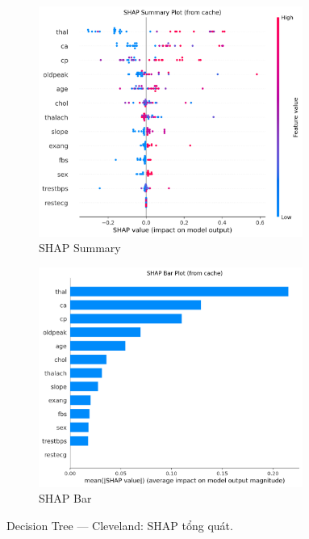 \begin{figure}[H]
\centering
\begin{subfigure}[b]{0.48\textwidth}\centering
\includegraphics[width=0.95\textwidth]{Result/cleveland_dataset/DT/SHAP/Summary.png}
\caption{SHAP Summary}\label{fig:dt_clev_shap_summary}
\end{subfigure}\hfill
\begin{subfigure}[b]{0.48\textwidth}\centering
\includegraphics[width=0.95\textwidth]{Result/cleveland_dataset/DT/SHAP/Bar.png}
\caption{SHAP Bar}\label{fig:dt_clev_shap_bar}
\end{subfigure}
\caption{Decision Tree — Cleveland: SHAP tổng quát.}
\label{fig:dt_clev_shap_overview}
\end{figure}


